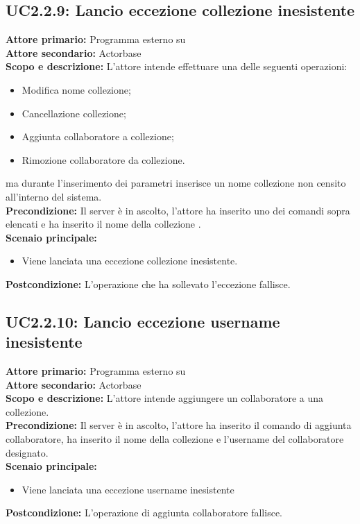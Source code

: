 \documentclass{scalatekids-article}
\begin{document}
\subsection{UC2.2.9: Lancio eccezione collezione inesistente}

\textbf{Attore primario:} Programma esterno su \\
\textbf{Attore secondario:} Actorbase\\
\textbf{Scopo e descrizione:} L'attore intende effettuare una delle seguenti operazioni:
\begin{itemize}
\item Modifica nome collezione;
\item Cancellazione collezione;
\item Aggiunta collaboratore a collezione;
\item Rimozione collaboratore da collezione.
\end{itemize}
ma durante l'inserimento dei parametri inserisce un nome collezione non censito all'interno del sistema.\\
\textbf{Precondizione:} Il server è in ascolto, l'attore ha inserito uno dei comandi sopra elencati e ha inserito il nome della collezione .\\
\textbf{Scenaio principale:}
\begin{itemize}
\item Viene lanciata una eccezione collezione inesistente.
\end{itemize}
\textbf{Postcondizione:} L'operazione che ha sollevato l'eccezione fallisce.

\subsection{UC2.2.10: Lancio eccezione username inesistente}

\textbf{Attore primario:} Programma esterno su \\
\textbf{Attore secondario:} Actorbase\\
\textbf{Scopo e descrizione:} L'attore intende aggiungere un collaboratore a una collezione.\\
\textbf{Precondizione:} Il server è in ascolto, l'attore ha inserito il comando di aggiunta collaboratore, ha inserito il nome della collezione e l'username del collaboratore designato.\\
\textbf{Scenaio principale:}
\begin{itemize}
\item Viene lanciata una eccezione username inesistente
\end{itemize}
\textbf{Postcondizione:} L'operazione di aggiunta collaboratore fallisce.
\end{document}

